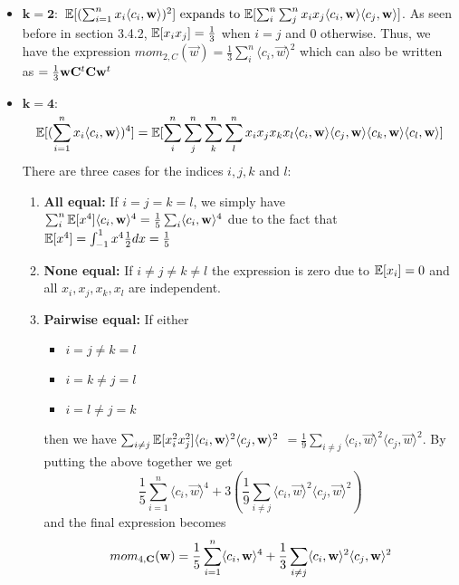 \begin{itemize}
    \item $\mathbf{k = 2: }$
        $\mathbb{E}[(\sum_{i=1}^{n} x_i \langle c_i, \mathbf{w} \rangle ) ^2] \text{ expands to } \mathbb{E}[\sum_{i}^{n} \sum_{j}^{n} x_i x_j \langle c_i, \mathbf{w} \rangle \langle c_j, \mathbf{w} \rangle]$.
        As seen before in section 3.4.2, $\mathbb{E}[x_i x_j] = \frac{1}{3}$ when $i = j$ and $0$ otherwise. Thus, we have the expression 
        $mom_{2, C}(\vec{w}) = \frac{1}{3} \sum_{i}^{n} \langle c_i, \vec{w} \rangle ^2$ which can also be written as
        $ = \frac{1}{3} \mathbf{w} \mathbf{C}^t \mathbf{C} \mathbf{w}^t$ 

    \item $\mathbf{k = 4: }$
        \[ \mathbb{E}[(\sum_{i=1}^{n} x_i \langle c_i, \mathbf{w} \rangle ) ^4] = 
        \mathbb{E}[\sum_{i}^{n} \sum_{j}^{n} \sum_{k}^{n} \sum_{l}^{n} x_i x_j x_k x_l 
        \langle c_i, \mathbf{w} \rangle \langle c_j, \mathbf{w} \rangle
    \langle c_k, \mathbf{w} \rangle \langle c_l, \mathbf{w} \rangle] \]
    There are three cases for the indices $i, j, k$ and $l$:
    \begin{enumerate}
        \item \textbf{All equal: } If $i = j = k = l$, we simply have $\sum_i^n \mathbb{E}[x^4] \langle c_i, \mathbf{w} \rangle ^4 = \frac{1}{5} \sum_i \langle c_i, \mathbf{w} \rangle ^4$
            due to the fact that $\mathbb{E}[x ^4] = \int_{-1}^{1} x^4 \frac{1}{2} dx = \frac{1}{5}$
        \item \textbf{None equal:} If $i \neq j \neq k \neq l$ the expression is zero due to $\mathbb{E}[x_i] = 0$ and all $x_i, x_j, x_k, x_l$ are independent.
        \item \textbf{Pairwise equal:} If either 
            \begin{itemize}
                \item $i = j \neq k = l$
                \item $i = k \neq j = l$ 
                \item $i = l \neq j = k$
            \end{itemize}
            then we have 
            $\sum_{i \neq j} \mathbb{E}[x_i ^2 x_j^2] \langle c_i, \mathbf{w} \rangle ^2 \langle c_j, \mathbf{w} \rangle^2$ 
            $ = \frac{1}{9} \sum_{i \neq j} \langle c_i, \vec{w} \rangle^2 \langle c_j, \vec{w} \rangle^2$. By putting the above together we get
            \[\frac{1}{5} \sum_{i=1}^{n} \langle c_i, \vec{w} \rangle ^4 + 3(\frac{1}{9} \sum_{i \neq j} \langle c_i, \vec{w} \rangle ^2 \langle c_j, \vec{w} \rangle ^2)\]
            and the final expression becomes 
            \[ mom_{4, \mathbf{C}} (\mathbf{w}) = \frac{1}{5} \sum_{i=1}^{n} \langle c_i, \mathbf{w} \rangle ^4 + \frac{1}{3} \sum_{i \neq j} \langle c_i, \mathbf{w} \rangle ^2 \langle c_j, \mathbf{w} \rangle ^2\]
    \end{enumerate}
    \end{itemize}

